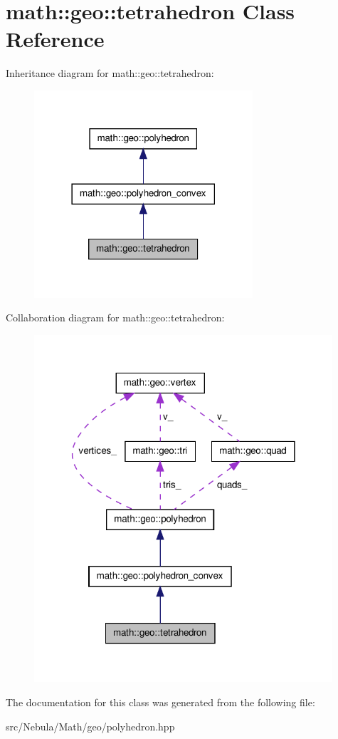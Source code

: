 \hypertarget{classmath_1_1geo_1_1tetrahedron}{\section{math\-:\-:geo\-:\-:tetrahedron \-Class \-Reference}
\label{classmath_1_1geo_1_1tetrahedron}
}


\-Inheritance diagram for math\-:\-:geo\-:\-:tetrahedron\-:\nopagebreak
\begin{figure}[H]
\begin{center}
\leavevmode
\includegraphics[width=230pt]{classmath_1_1geo_1_1tetrahedron__inherit__graph}
\end{center}
\end{figure}


\-Collaboration diagram for math\-:\-:geo\-:\-:tetrahedron\-:\nopagebreak
\begin{figure}[H]
\begin{center}
\leavevmode
\includegraphics[width=314pt]{classmath_1_1geo_1_1tetrahedron__coll__graph}
\end{center}
\end{figure}


\-The documentation for this class was generated from the following file\-:\begin{DoxyCompactItemize}
\item 
src/\-Nebula/\-Math/geo/polyhedron.\-hpp\end{DoxyCompactItemize}

